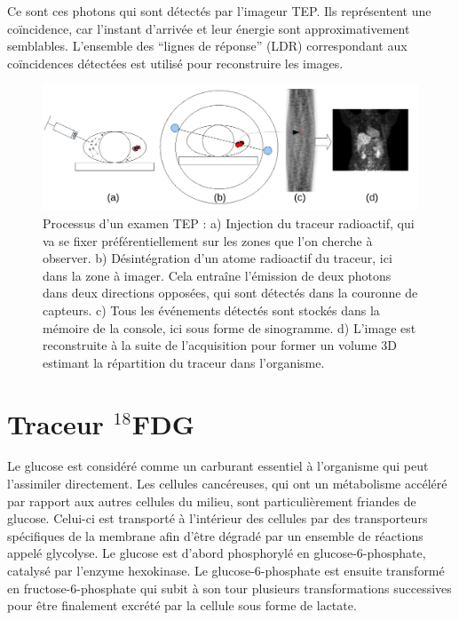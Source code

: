 Ce sont ces photons qui sont détectés par l'imageur TEP. Ils représentent une coïncidence, car l'instant d'arrivée et leur énergie sont approximativement semblables. L'ensemble des ``lignes de réponse'' (LDR) correspondant aux coïncidences détectées est utilisé pour reconstruire les images.

\begin{figure}
\centering
\includegraphics[width=16cm]{images/schemaTEP}
\caption[Présentation simplifiée de la TEP]{Processus d'un examen TEP : a) Injection du traceur radioactif, qui va se fixer préférentiellement sur les zones que l'on cherche à observer. b) Désintégration d'un atome radioactif du traceur, ici dans la zone à imager. Cela entraîne l'émission de deux photons dans deux directions opposées, qui sont détectés dans la couronne de capteurs. c) Tous les événements détectés sont stockés dans la mémoire de la console, ici sous forme de sinogramme. d) L'image est reconstruite à la suite de l'acquisition pour former un volume 3D estimant la répartition du traceur dans l'organisme.}
\label{fig:schemaTEP}
\end{figure}


\section{Traceur $^{18}$FDG}

Le glucose est considéré comme un carburant essentiel à l’organisme qui peut l’assimiler directement. Les cellules cancéreuses, qui ont un métabolisme accéléré par rapport aux autres cellules du milieu, sont particulièrement friandes de glucose. Celui-ci est transporté à l’intérieur des cellules par des transporteurs spécifiques de la membrane afin d’être dégradé par un ensemble de réactions appelé glycolyse. Le glucose est d’abord phosphorylé en glucose-6-phosphate, catalysé par l’enzyme hexokinase. Le glucose-6-phosphate est ensuite transformé en fructose-6-phosphate qui subit à son tour plusieurs transformations successives pour être finalement excrété par la cellule sous forme de lactate.

